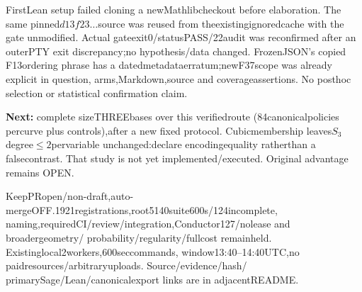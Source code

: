 \documentclass[11pt]{article}\usepackage[margin=.78in]{geometry}\usepackage{amsmath,amssymb,graphicx,booktabs,hyperref}\setlength{\parindent}{0pt}\setlength{\parskip}{6pt}
\begin{document}
FirstLean setup failed cloning a newMathlibcheckout before elaboration. The same
pinned$d13f23\ldots$source was reused from theexistingignoredcache with the gate
unmodified. Actual gateexit0/statusPASS/22audit was reconfirmed after an outerPTY
exit discrepancy;no hypothesis/data changed. FrozenJSON's copied F13ordering
phrase has a datedmetadataerratum;newF37scope was already explicit in question,
arms,Markdown,source and coverageassertions. No posthoc selection or statistical
confirmation claim.

\textbf{Next:} complete sizeTHREEbases over this verifiedroute (84canonicalpolicies
percurve plus controls),after a new fixed protocol. Cubicmembership leaves$S_3$
degree$\le2$pervariable unchanged:declare encodingequality ratherthan a falsecontrast.
That study is not yet implemented/executed. Original advantage remains OPEN.

KeepPRopen/non-draft,auto-mergeOFF.1921registrations,root5140suite600s/124incomplete,
naming,requiredCI/review/integration,Conductor127/nolease and broadergeometry/
probability/regularity/fullcost remainheld. Existinglocal2workers,600seccommands,
window13:40--14:40UTC,no paidresources/arbitraryuploads. Source/evidence/hash/
primarySage/Lean/canonicalexport links are in adjacentREADME.
\end{document}
